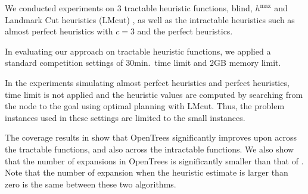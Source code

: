 We conducted experiments on 3 tractable heuristic functions, blind, $h^{\mbox{max}}$ and Landmark Cut heuristics (LMcut) \cite{Helmert2009}, as well as the intractable heuristics such as almost perfect heuristics with $c=3$ and the perfect heuristics.

In evaluating our approach on tractable heuristic functions, we applied a standard competition settings of 30min.\ time limit and 2GB memory limit.

In the experiments simulating almost perfect heuristics and perfect
heuristics, time limit is not applied and the heuristic values are computed by searching
from the node to the goal using optimal planning with LMcut. Thus, the
problem instances used in these settings are limited to the small instances.

The coverage results in  show that OpenTrees significantly improves upon \astar across the tractable functions, and also across the intractable functions. We also show that the number of expansions in OpenTrees is significantly smaller than that of \astar. Note that the number of expansion when the heuristic estimate is larger than zero is the same between these two algorithms.

